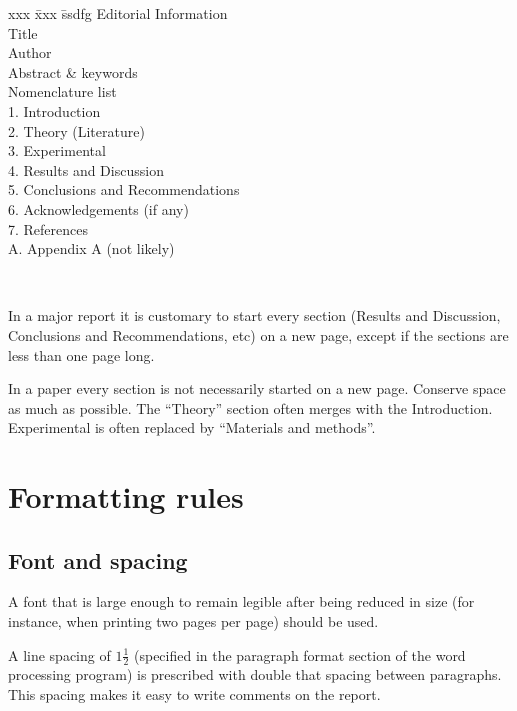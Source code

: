 \documentclass[a5paper, 10pt]{article}
\begin{document}
\begin{table}[htbp]
\begin{centering}
\begin{boxedminipage}[t]{0.4\textwidth}
\begin{spacing}{1.8}
    \begin{tabbing}
      xxx \= xxx \= ssdfg \kill
      Editorial Information                  \\
          \> Title                           \\
          \> Author                          \\         
          \> Abstract \& keywords            \\
          \> Nomenclature list               \\
      1.  \> Introduction                    \\
      2.  \> Theory (Literature)             \\
      3.  \> Experimental                    \\
      4.  \> Results and Discussion          \\
      5.  \> Conclusions and Recommendations \\
      6.  \> Acknowledgements  (if any)      \\
      7.  \> References                      \\
      A.  \> Appendix A  (not likely)        
    \end{tabbing}
  \end{spacing}
\end{boxedminipage}\\
\end{centering}
In a major report it is customary to start every section (Results and Discussion,
Conclusions and Recommendations, etc) on a new page, except if the sections are less than one page long.\bigskip

In a paper every section is not necessarily started on a new page.
Conserve space as much as possible. The ``Theory'' section often merges with the
Introduction. Experimental is often replaced by ``Materials and methods''.
\end{table}

\section{Formatting rules}
\subsection{Font and spacing}
A font that is large enough to remain legible after being reduced in
size (for instance, when printing two pages per page) should be used.

A line spacing of $1\frac{1}{2}$ (specified in the 
paragraph format section of the word processing program) is prescribed
with double that spacing between paragraphs.  
This spacing makes it easy to write comments on the report.
\end{document}
